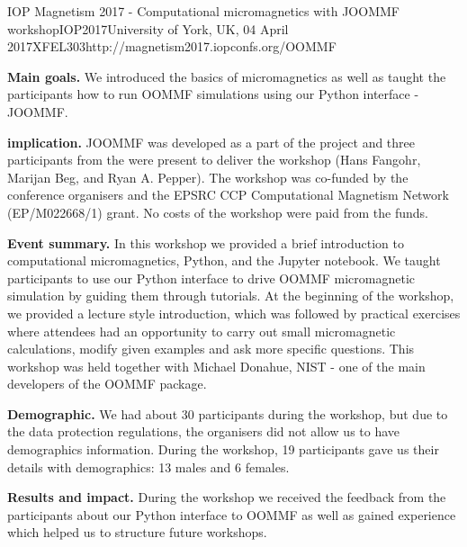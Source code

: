 \begin{event}{IOP Magnetism 2017 - Computational micromagnetics with JOOMMF workshop}{IOP2017}{University of York, UK, 04 April 2017}{XFEL}{30}{3}{http://magnetism2017.iopconfs.org/OOMMF}

\textbf{Main goals.} We introduced the basics of micromagnetics as well as taught the participants how to run OOMMF simulations using our Python interface - JOOMMF.

\textbf{\ODK implication.} JOOMMF was developed as a part of the \ODK project and three participants from the \ODK were present to deliver the workshop (Hans Fangohr, Marijan Beg, and Ryan A. Pepper). The workshop was co-funded by the conference organisers and the EPSRC CCP Computational Magnetism Network (EP/M022668/1) grant. No costs of the workshop were paid from the \ODK funds.

\textbf{Event summary.} In this workshop we provided a brief introduction to computational micromagnetics, Python, and the Jupyter notebook. We taught participants to use our Python interface to drive OOMMF micromagnetic simulation by guiding them through tutorials. At the beginning of the workshop, we provided a lecture style introduction, which was followed by practical exercises where attendees had an opportunity to carry out small micromagnetic calculations, modify given examples and ask more specific questions. This workshop was held together with Michael Donahue, NIST - one of the main developers of the OOMMF package.

\textbf{Demographic.} We had about 30 participants during the workshop, but due to the data protection regulations, the organisers did not allow us to have demographics information. During the workshop, 19 participants gave us their details with demographics: 13 males and 6 females.

\textbf{Results and impact.} During the workshop we received the feedback from the participants about our Python interface to OOMMF as well as gained experience which helped us to structure future workshops.

\end{event}
